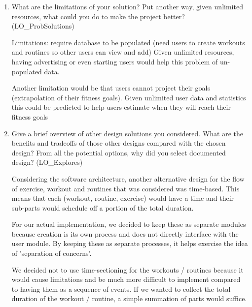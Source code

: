 \documentclass[12pt, titlepage]{article}
\begin{document}
	\begin{enumerate}
		\item What are the limitations of your solution?  Put another way, given
		unlimited resources, what could you do to make the project better? (LO\_ProbSolutions)
		
		Limitations: require database to be populated (need users to create workouts and routines so other users can view and add)
		Given unlimited resources, having advertising or even starting users would help this problem of un-populated data.
		
		Another limitation would be that users cannot project their goals (extrapolation of their fitness goals).
		Given unlimited user data and statistics this could be predicted to help users estimate when they will reach their fitness goals
		
		\item Give a brief overview of other design solutions you considered.  What
		are the benefits and tradeoffs of those other designs compared with the chosen
		design?  From all the potential options, why did you select documented design?
		(LO\_Explores)
		
		Considering the software architecture, another alternative design for the flow of exercise, workout and routines that was considered was time-based. This means that each (workout, routine, exercise) would have a time and their sub-parts would schedule off a portion of the total duration.

		For our actual implementation, we decided to keep these as separate modules because creation is its own process and does not directly interface with the user module. By keeping these as separate processes, it helps exercise the idea of 'separation of concerns'.
		
		We decided not to use time-sectioning for the workouts / routines because it would cause limitations and be much more difficult to implement compared to having them as a sequence of events. If we wanted to collect the total duration of the workout / routine, a simple summation of parts would suffice.
		
	\end{enumerate}
	
\end{document}
